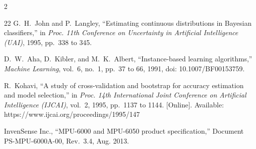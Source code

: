 \documentclass[journal,onecolumn]{IEEEtran}
\begin{document}
\begin{multicols}{2}
\begin{thebibliography}{22}
G.~H.~John and P.~Langley, ``Estimating continuous distributions in Bayesian classifiers,'' in \emph{Proc. 11th Conference on Uncertainty in Artificial Intelligence (UAI)}, 1995, pp.~338 to 345.

D.~W.~Aha, D.~Kibler, and M.~K.~Albert, ``Instance-based learning algorithms,'' \emph{Machine Learning}, vol.~6, no.~1, pp.~37 to 66, 1991, doi: 10.1007/BF00153759.

R.~Kohavi, ``A study of cross-validation and bootstrap for accuracy estimation and model selection,'' in \emph{Proc. 14th International Joint Conference on Artificial Intelligence (IJCAI)}, vol.~2, 1995, pp.~1137 to 1144. [Online]. Available: https://www.ijcai.org/proceedings/1995/147

InvenSense Inc., ``MPU-6000 and MPU-6050 product specification,'' Document PS-MPU-6000A-00, Rev.~3.4, Aug. 2013.

\end{thebibliography}
\end{multicols}
\endgroup
\end{document}

